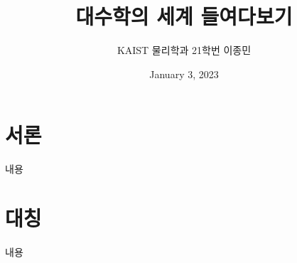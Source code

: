 \documentclass[11pt]{book}
\title{대수학의 세계 들여다보기}
\author{KAIST 물리학과 21학번 이종민}
\date{January 3, 2023}
\begin{document}
\section*{서론}
\begin{MLPar}
내용
\end{MLPar}

\section{대칭}
\begin{MLPar}
내용
\end{MLPar}
\end{document}
